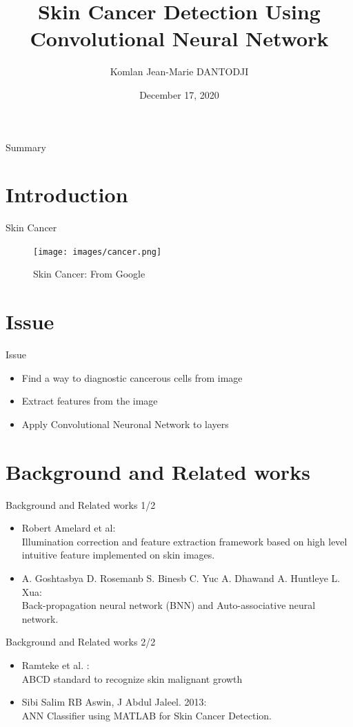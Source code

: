 \documentclass{beamer}
\title[Skin Cancer Detection Using Convolutional Neural Network] 
{Skin Cancer Detection Using Convolutional Neural Network}
\author[Komlan Dantodji] 
{Komlan Jean-Marie DANTODJI}
\institute[]
{
  Etudiant en M1 Big Data
  \and
  Université Paris 8}
\date{December 17, 2020}
\begin{document}
\begin{frame}
  \titlepage
\end{frame}

\begin{frame}{Summary}
  \tableofcontents
\end{frame}

\section{Introduction}
\begin{frame}{Skin Cancer}
\begin{figure}[H]
    \texttt{[image: images/cancer.png]}
    \caption{ Skin Cancer: From Google}
    \label{fig:L1}
\end{figure}
\end{frame}

\section{Issue}
\begin{frame}{Issue}
\begin{itemize}
		\item Find a way to diagnostic cancerous cells from image 
		\item Extract features from the image
		\item Apply Convolutional Neuronal Network to layers 
\end{itemize}
\end{frame} 

\section{Background and Related works}
\begin{frame}{Background and Related works 1/2}
\begin{itemize}
		\item Robert Amelard et al:\\
		Illumination correction and feature extraction framework based on high level intuitive feature implemented on skin images.
		\item A. Goshtasbya D. Rosemanb S. Binesb C. Yuc A. Dhawand A. Huntleye L. Xua:\\
		Back-propagation neural network (BNN) and Auto-associative neural network.
\end{itemize}
\end{frame} 
\begin{frame}{Background and Related works 2/2}
\begin{itemize}
		\item Ramteke et al. : \\
		ABCD standard to recognize skin malignant growth
		\item Sibi Salim RB Aswin, J Abdul Jaleel. 2013: \\
		ANN Classifier using MATLAB for Skin Cancer Detection.
\end{itemize}
\end{frame} 
\end{document}
